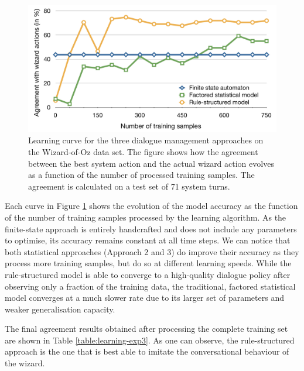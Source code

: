 \begin{figure}[h]
\begin{center}
\includegraphics[scale=0.42]{imgs/curve-exp3.pdf}
\end{center} 
\caption{Learning curve for the three dialogue management approaches on the Wizard-of-Oz data set.  The figure shows how the agreement between the best system action and the actual wizard action evolves as a function of the number of processed training samples.  The agreement is calculated on a test set of 71 system turns.}
\label{fig:curve-exp3}
\end{figure}


Each curve in Figure \ref{fig:curve-exp3} shows the evolution of the model accuracy as the function of the number of training samples processed by the learning algorithm.  As the finite-state approach is entirely handcrafted and does not include any parameters to optimise, its accuracy remains constant at all time steps. We can notice that both statistical approaches (Approach 2 and 3) do improve their accuracy as they process more training samples, but do so at different learning speeds.  While the rule-structured model is able to converge to a high-quality dialogue policy after observing only a fraction of the training data, the traditional, factored statistical model converges at a much slower rate due to its larger set of parameters and weaker generalisation capacity. 

The final agreement results obtained after processing the complete training set are shown in Table \ref{table:learning-exp3}.  As one can observe, the rule-structured approach is the one that is best able to imitate the conversational behaviour of the wizard. 

